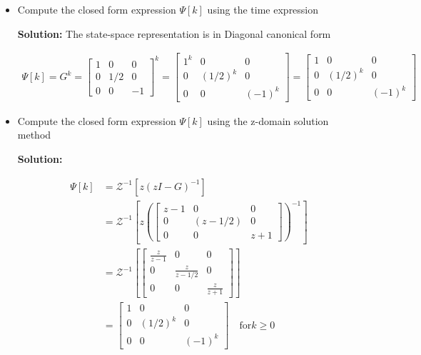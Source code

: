 \documentclass[twoside]{article}
\begin{document}
\begin{itemize}
  \item Compute the closed form expression $\Psi[k]$ using the time
   expression

    \textbf{Solution:} The state-space representation is in Diagonal
    canonical form
    
\begin{align*}
  \Psi[k]  = G^k = \left[ \begin{array}{ccc} 1 & 0 & 0\\ 0 & 1/2 & 0
    \\ 0 & 0 & -1 \end{array} \right]^k 
    = \left[ \begin{array}{ccc} 1^k & 0 & 0\\ 0 & (1/2)^k & 0
    \\ 0 & 0 & (-1)^k \end{array} \right]
 = \left[ \begin{array}{ccc} 1 & 0 & 0\\ 0 & (1/2)^k & 0
    \\ 0 & 0 & (-1)^k \end{array} \right]
\end{align*}    

\item Compute the closed form expression $\Psi[k]$ using the z-domain 
  solution method

\textbf{Solution:}

\begin{align*}
  \Psi[k]  &= \mathcal{Z}^{-1} \left[   z \left( z I - G \right)^{-1} \right]
\\
&= \mathcal{Z}^{-1} \left[   z \left( \left[ \begin{array}{ccc} z-1 & 0 & 0\\ 0 & (z-1/2) & 0
    \\ 0 & 0 & z+1 \end{array} \right] \right)^{-1} \right]
\\
&= \mathcal{Z}^{-1} \left[   \left[ \begin{array}{ccc} \frac{z}{z-1} & 0 & 0\\ 0 & \frac{z}{z-1/2} & 0
    \\ 0 & 0 & \frac{z}{z+1} \end{array} \right] \right]
\\
&= \left[ \begin{array}{ccc} 1 & 0 & 0\\ 0 & (1/2)^k & 0
    \\ 0 & 0 & (-1)^k \end{array} \right] \quad \mathrm{for} k \geq 0
\end{align*}    


\end{itemize}
\end{document}
